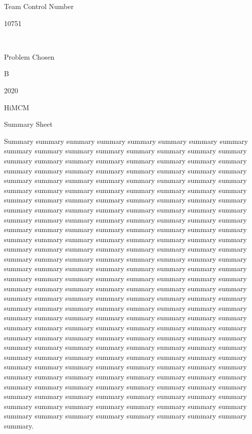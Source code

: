 \documentclass{article}
\begin{document}
\begin{center}
Team Control Number

\Huge 10751

\normalsize ~

Problem Chosen

\Huge B

\Large 2020

HiMCM

Summary Sheet
\end{center}

\normalsize

Summary summary summary summary summary summary summary summary summary summary summary summary summary summary summary summary summary summary summary summary summary summary summary summary summary summary summary summary summary summary summary summary summary summary summary summary summary summary summary summary summary summary summary summary summary summary summary summary summary summary summary summary summary summary summary summary summary summary summary summary summary summary summary summary summary summary summary summary summary summary summary summary summary summary summary summary summary summary summary summary summary summary summary summary summary summary summary summary summary summary summary summary summary summary summary summary summary summary summary summary summary summary summary summary summary summary summary summary summary summary summary summary summary summary summary summary summary summary summary summary summary summary summary summary summary summary summary summary summary summary summary summary summary summary summary summary summary summary summary summary summary summary summary summary summary summary summary summary summary summary summary summary summary summary summary summary summary summary summary summary summary summary summary summary summary summary summary summary summary summary summary summary summary summary summary summary summary summary summary summary summary summary summary summary summary summary summary summary summary summary summary summary summary summary summary summary summary summary summary summary summary summary summary summary summary summary summary summary summary summary summary summary summary summary summary summary summary summary summary summary summary summary summary summary summary summary summary summary summary summary summary summary summary.

\newpage

\tableofcontents
\end{document}
